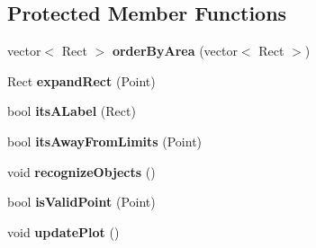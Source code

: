 \subsection*{Protected Member Functions}
\begin{DoxyCompactItemize}
\item 
\hypertarget{classvision_af64ac1451112ad24c36ec25db081729e}{vector$<$ Rect $>$ {\bfseries order\-By\-Area} (vector$<$ Rect $>$)}\label{classvision_af64ac1451112ad24c36ec25db081729e}

\item 
\hypertarget{classvision_a547beeec2c8fdf11eb3821071102e533}{Rect {\bfseries expand\-Rect} (Point)}\label{classvision_a547beeec2c8fdf11eb3821071102e533}

\item 
\hypertarget{classvision_ae279754cc1e9370c3110f3ede4acae40}{bool {\bfseries its\-A\-Label} (Rect)}\label{classvision_ae279754cc1e9370c3110f3ede4acae40}

\item 
\hypertarget{classvision_acbbb21511dfafeb93ed58451c843d6f1}{bool {\bfseries its\-Away\-From\-Limits} (Point)}\label{classvision_acbbb21511dfafeb93ed58451c843d6f1}

\item 
\hypertarget{classvision_aa220323a006372ceebccab4a51498319}{void {\bfseries recognize\-Objects} ()}\label{classvision_aa220323a006372ceebccab4a51498319}

\item 
\hypertarget{classvision_a63699f62d8601812f48a8b06ad8309f1}{bool {\bfseries is\-Valid\-Point} (Point)}\label{classvision_a63699f62d8601812f48a8b06ad8309f1}

\item 
\hypertarget{classvision_a71ea3478a09dc629bcf7b4d84a27c4b7}{void {\bfseries update\-Plot} ()}\label{classvision_a71ea3478a09dc629bcf7b4d84a27c4b7}

\end{DoxyCompactItemize}
